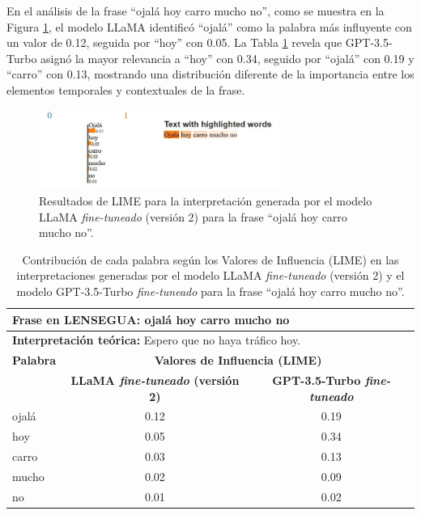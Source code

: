 En el análisis de la frase “ojalá hoy carro mucho no”, como se muestra en la Figura \ref{fig:LIME2-F1}, el modelo LLaMA identificó “ojalá” como la palabra más influyente con un valor de 0.12, seguida por “hoy” con 0.05. La Tabla \ref{tab:LIME2-1} revela que GPT-3.5-Turbo asignó la mayor relevancia a “hoy” con 0.34, seguido por “ojalá” con 0.19 y “carro” con 0.13, mostrando una distribución diferente de la importancia entre los elementos temporales y contextuales de la frase.

\begin{figure}[H]
\centering
    \includegraphics[width=0.7\textwidth]{figuras/Oracion1.JPG}
    \caption{Resultados de LIME para la interpretación generada por el modelo LLaMA \textit{fine-tuneado} (versión 2) para la frase “ojalá hoy carro mucho no”.}
    \label{fig:LIME2-F1}
\end{figure}

\vspace{0.5cm}
\begin{table}[H]
\centering
    \begin{tabular}{|l|c|c|}
        \hline
        \multicolumn{3}{|l|}{\textbf{Frase en LENSEGUA:} ojalá hoy carro mucho no} \\ \hline
        \multicolumn{3}{|l|}{\textbf{Interpretación teórica:} Espero que no haya tráfico hoy.} \\ \hline \hline
        
        \textbf{Palabra} & \multicolumn{2}{c|}{\textbf{Valores de Influencia (LIME)}} \\ 
        \cline{2-3}
        & \textbf{LLaMA \textit{fine-tuneado} (versión 2)} & \textbf{GPT-3.5-Turbo \textit{fine-tuneado}} \\
         
        \hline
        ojalá & 0.12 & 0.19 \\
        \hline
        hoy & 0.05 & 0.34 \\
        \hline
        carro & 0.03  & 0.13 \\
        \hline
        mucho & 0.02  & 0.09 \\
        \hline
        no & 0.01  & 0.02 \\
        \hline
        
    \end{tabular}
\caption{Contribución de cada palabra según los Valores de Influencia (LIME) en las interpretaciones generadas por el modelo LLaMA \textit{fine-tuneado} (versión 2) y el modelo GPT-3.5-Turbo \textit{fine-tuneado} para la frase “ojalá hoy carro mucho no”.}
\label{tab:LIME2-1}
\end{table}

